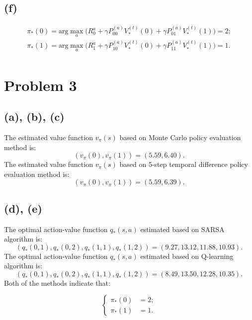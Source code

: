 \documentclass[12pt]{article}
\begin{document}
\subsection*{(f)}
\begin{align*}
\pi_{*}(0) = \mathrm{arg} \max_a \bigg(  R_0^a + \gamma P_{00}^{(a)} V_{*}^{(t)}(0) +   \gamma P_{01}^{(a)} V_{*}^{(t)}(1)  \bigg) =  2; \\
\pi_{*}(1) = \mathrm{arg} \max_a \bigg(  R_1^a + \gamma P_{10}^{(a)} V_{*}^{(t)}(0) +   \gamma P_{11}^{(a)} V_{*}^{(t)}(1)  \bigg) =  1. \\
\end{align*}




\section*{Problem 3}

\subsection*{(a), (b), (c)}

The estimated value function $v_{\pi}(s)$ based on Monte Carlo policy evaluation method is: 
$$  (v_{\pi}(0), v_{\pi}(1)) = (5.59, 6.40). $$
The estimated value function $v_{\pi}(s)$ based on  5-step temporal difference policy evaluation method is:
$$  (v_{\pi}(0), v_{\pi}(1)) = (5.59, 6.39). $$

\subsection*{(d), (e)}
The optimal action-value function $q_{*}(s, a)$ estimated based on SARSA algorithm is:
$$ (q_{*}(0, 1), q_{*}(0, 2), q_{*}(1, 1), q_{*}(1, 2)) = (9.27, 13.12, 11.88, 10.93). $$
The optimal action-value function $q_{*}(s, a)$ estimated based on Q-learning algorithm is:
$$ (q_{*}(0, 1), q_{*}(0, 2), q_{*}(1, 1), q_{*}(1, 2)) = (8.49, 13.50, 12.28, 10.35). $$
Both of the methods indicate that:

\begin{equation*}
\left\{
\begin{aligned}
\pi_{*}(0) &=  2; \\
\pi_{*}(1) &=  1. 
\end{aligned}
\right.
\end{equation*}
\end{document}
